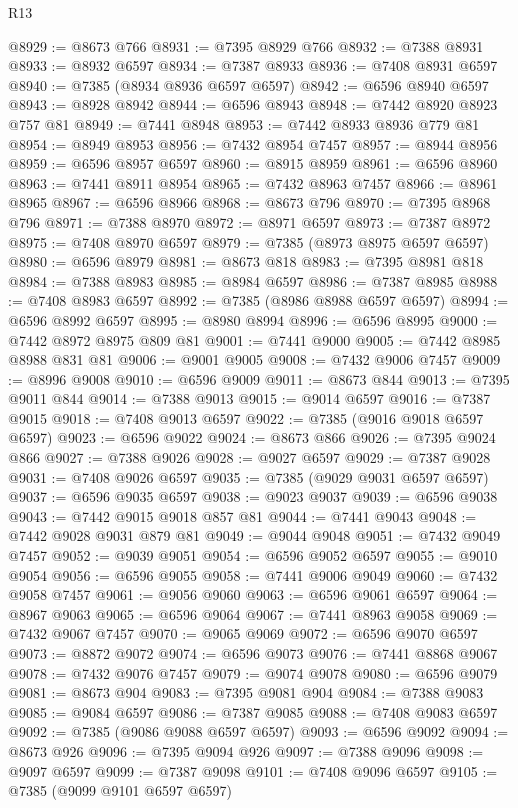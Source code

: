 \begin{lexlean}{R13}
\begin{coremodule}
@8929 := @8673 @766
@8931 := @7395 @8929 @766
@8932 := @7388 @8931
@8933 := @8932 @6597
@8934 := @7387 @8933
@8936 := @7408 @8931 @6597
@8940 := @7385 (@8934 @8936 @6597 @6597)
@8942 := @6596 @8940 @6597
@8943 := @8928 @8942
@8944 := @6596 @8943
@8948 := @7442 @8920 @8923 @757 @81
@8949 := @7441 @8948
@8953 := @7442 @8933 @8936 @779 @81
@8954 := @8949 @8953
@8956 := @7432 @8954 @7457
@8957 := @8944 @8956
@8959 := @6596 @8957 @6597
@8960 := @8915 @8959
@8961 := @6596 @8960
@8963 := @7441 @8911 @8954
@8965 := @7432 @8963 @7457
@8966 := @8961 @8965
@8967 := @6596 @8966
@8968 := @8673 @796
@8970 := @7395 @8968 @796
@8971 := @7388 @8970
@8972 := @8971 @6597
@8973 := @7387 @8972
@8975 := @7408 @8970 @6597
@8979 := @7385 (@8973 @8975 @6597 @6597)
@8980 := @6596 @8979
@8981 := @8673 @818
@8983 := @7395 @8981 @818
@8984 := @7388 @8983
@8985 := @8984 @6597
@8986 := @7387 @8985
@8988 := @7408 @8983 @6597
@8992 := @7385 (@8986 @8988 @6597 @6597)
@8994 := @6596 @8992 @6597
@8995 := @8980 @8994
@8996 := @6596 @8995
@9000 := @7442 @8972 @8975 @809 @81
@9001 := @7441 @9000
@9005 := @7442 @8985 @8988 @831 @81
@9006 := @9001 @9005
@9008 := @7432 @9006 @7457
@9009 := @8996 @9008
@9010 := @6596 @9009
@9011 := @8673 @844
@9013 := @7395 @9011 @844
@9014 := @7388 @9013
@9015 := @9014 @6597
@9016 := @7387 @9015
@9018 := @7408 @9013 @6597
@9022 := @7385 (@9016 @9018 @6597 @6597)
@9023 := @6596 @9022
@9024 := @8673 @866
@9026 := @7395 @9024 @866
@9027 := @7388 @9026
@9028 := @9027 @6597
@9029 := @7387 @9028
@9031 := @7408 @9026 @6597
@9035 := @7385 (@9029 @9031 @6597 @6597)
@9037 := @6596 @9035 @6597
@9038 := @9023 @9037
@9039 := @6596 @9038
@9043 := @7442 @9015 @9018 @857 @81
@9044 := @7441 @9043
@9048 := @7442 @9028 @9031 @879 @81
@9049 := @9044 @9048
@9051 := @7432 @9049 @7457
@9052 := @9039 @9051
@9054 := @6596 @9052 @6597
@9055 := @9010 @9054
@9056 := @6596 @9055
@9058 := @7441 @9006 @9049
@9060 := @7432 @9058 @7457
@9061 := @9056 @9060
@9063 := @6596 @9061 @6597
@9064 := @8967 @9063
@9065 := @6596 @9064
@9067 := @7441 @8963 @9058
@9069 := @7432 @9067 @7457
@9070 := @9065 @9069
@9072 := @6596 @9070 @6597
@9073 := @8872 @9072
@9074 := @6596 @9073
@9076 := @7441 @8868 @9067
@9078 := @7432 @9076 @7457
@9079 := @9074 @9078
@9080 := @6596 @9079
@9081 := @8673 @904
@9083 := @7395 @9081 @904
@9084 := @7388 @9083
@9085 := @9084 @6597
@9086 := @7387 @9085
@9088 := @7408 @9083 @6597
@9092 := @7385 (@9086 @9088 @6597 @6597)
@9093 := @6596 @9092
@9094 := @8673 @926
@9096 := @7395 @9094 @926
@9097 := @7388 @9096
@9098 := @9097 @6597
@9099 := @7387 @9098
@9101 := @7408 @9096 @6597
@9105 := @7385 (@9099 @9101 @6597 @6597)

\end{coremodule}
\end{lexlean}
